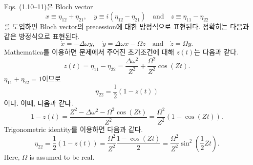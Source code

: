 \documentclass[10pt, a4paper]{article}
\numberwithin{equation}{section}
\begin{document}
    \subsection{}
    Eqs. (1.10--11)은 Bloch vector
    \begin{equation}
        x \equiv \eta_{12} + \eta_{21}, \quad y \equiv i(\eta_{12} - \eta_{21}) \quad \text{and} \quad z \equiv \eta_{11} - \eta_{22}
    \end{equation}
    를 도입하면 Bloch vector의 precession에 대한 방정식으로 표현된다. 정확히는 다음과 같은 방정식으로 표현된다.
    \begin{equation}
        \dot{x} = -\Delta \omega y, \quad \dot{y} = \Delta\omega x - \Omega z \quad \text{and} \quad \dot{z} = \Omega y.
    \end{equation}
    Mathematica를 이용하면 문제에서 주어진 초기조건에 대해 $z(t)$는 다음과 같다.
    \begin{equation}
        z(t) = \eta_{11} - \eta_{22} = \dfrac{\Delta \omega^2}{Z^2} + \dfrac{\Omega^2}{Z^2}\cos(Zt).
    \end{equation}
    $\eta_{11} + \eta_{22} = 1$이므로
    \begin{equation}
        \eta_{22} = \dfrac{1}{2}(1-z(t))
    \end{equation}
    이다. 이때, 다음과 같다.
    \begin{equation}
        1- z(t) = \dfrac{Z^2 - \Delta\omega^2 - \Omega^2 \cos(Zt)}{Z^2} = \dfrac{\Omega^2}{Z^2}(1- \cos(Zt)).
    \end{equation}
    Trigonometric identity를 이용하면 다음과 같다.
    \begin{equation}
        \eta_{22} = \dfrac{1}{2}(1- z(t)) = \dfrac{\Omega^2}{Z^2}\dfrac{1- \cos(Zt)}{2} = \dfrac{\Omega^2}{Z^2}\sin^2\left( \dfrac{1}{2}Zt\right).
    \end{equation}
    Here, $\Omega$ is assumed to be real.

    \section{}
\end{document}
